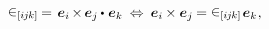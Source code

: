 \nopagebreak\vspace{-0.3em}\begin{equation*}
\permutationsparitysymbols{i\hspace{-0.1ex}j\hspace{-0.1ex}k} \hspace{-0.15ex} = \hspace{.15ex}
\hspace{.1ex} \bm{e}_i \hspace{-0.2ex} \times \hspace{-0.2ex} \bm{e}_j \hspace{-0.1ex} \dotp \hspace{.12ex} \bm{e}_k
\:\Leftrightarrow\:
\bm{e}_i \hspace{-0.1ex} \times \bm{e}_j \hspace{-0.12ex}
= \permutationsparitysymbols{i\hspace{-0.1ex}j\hspace{-0.1ex}k} \hspace{.2ex} \bm{e}_k
\hspace{.1ex} ,
\end{equation*}\vspace{-1.6em}
